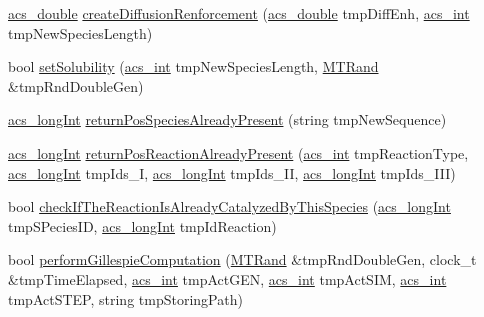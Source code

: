 \begin{DoxyCompactItemize}
\item 
\hyperlink{acs__headers_8h_ab776853a005fcbf56af0424a2a4dd607}{acs\-\_\-double} \hyperlink{classenvironment_af795a4d1f04dfbfcbdf321e20e74f9c2}{create\-Diffusion\-Renforcement} (\hyperlink{acs__headers_8h_ab776853a005fcbf56af0424a2a4dd607}{acs\-\_\-double} tmp\-Diff\-Enh, \hyperlink{acs__headers_8h_a8d277355641a098190360234e2ebde35}{acs\-\_\-int} tmp\-New\-Species\-Length)
\item 
bool \hyperlink{classenvironment_a496ba50d3a345cd842ce42406946405c}{set\-Solubility} (\hyperlink{acs__headers_8h_a8d277355641a098190360234e2ebde35}{acs\-\_\-int} tmp\-New\-Species\-Length, \hyperlink{class_m_t_rand}{M\-T\-Rand} \&tmp\-Rnd\-Double\-Gen)
\item 
\hyperlink{acs__headers_8h_a19319d75f02db4308bc5c0026d98cd85}{acs\-\_\-long\-Int} \hyperlink{classenvironment_a4e26cc574e20a5afcfbbe5887109c5af}{return\-Pos\-Species\-Already\-Present} (string tmp\-New\-Sequence)
\item 
\hyperlink{acs__headers_8h_a19319d75f02db4308bc5c0026d98cd85}{acs\-\_\-long\-Int} \hyperlink{classenvironment_a6feec5685b519ba0cdae0e5c59dffff0}{return\-Pos\-Reaction\-Already\-Present} (\hyperlink{acs__headers_8h_a8d277355641a098190360234e2ebde35}{acs\-\_\-int} tmp\-Reaction\-Type, \hyperlink{acs__headers_8h_a19319d75f02db4308bc5c0026d98cd85}{acs\-\_\-long\-Int} tmp\-Ids\-\_\-\-I, \hyperlink{acs__headers_8h_a19319d75f02db4308bc5c0026d98cd85}{acs\-\_\-long\-Int} tmp\-Ids\-\_\-\-I\-I, \hyperlink{acs__headers_8h_a19319d75f02db4308bc5c0026d98cd85}{acs\-\_\-long\-Int} tmp\-Ids\-\_\-\-I\-I\-I)
\item 
bool \hyperlink{classenvironment_ac4c90b07b8e75ea03e2ced0ea644a69f}{check\-If\-The\-Reaction\-Is\-Already\-Catalyzed\-By\-This\-Species} (\hyperlink{acs__headers_8h_a19319d75f02db4308bc5c0026d98cd85}{acs\-\_\-long\-Int} tmp\-S\-Pecies\-I\-D, \hyperlink{acs__headers_8h_a19319d75f02db4308bc5c0026d98cd85}{acs\-\_\-long\-Int} tmp\-Id\-Reaction)
\item 
bool \hyperlink{classenvironment_a2cb0152bf789918e7d92685f947ce48f}{perform\-Gillespie\-Computation} (\hyperlink{class_m_t_rand}{M\-T\-Rand} \&tmp\-Rnd\-Double\-Gen, clock\-\_\-t \&tmp\-Time\-Elapsed, \hyperlink{acs__headers_8h_a8d277355641a098190360234e2ebde35}{acs\-\_\-int} tmp\-Act\-G\-E\-N, \hyperlink{acs__headers_8h_a8d277355641a098190360234e2ebde35}{acs\-\_\-int} tmp\-Act\-S\-I\-M, \hyperlink{acs__headers_8h_a8d277355641a098190360234e2ebde35}{acs\-\_\-int} tmp\-Act\-S\-T\-E\-P, string tmp\-Storing\-Path)
\item 

\end{DoxyCompactItemize}
